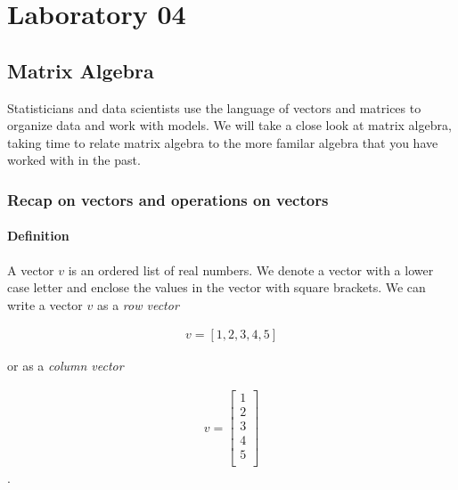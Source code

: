 
\chapter{Laboratory 04}


\hypertarget{matrix-algebra}{%
\section{Matrix Algebra}\label{matrix-algebra}}

Statisticians and data scientists use the language of vectors and
matrices to organize data and work with models. We will take a close
look at matrix algebra, taking time to relate matrix algebra to the more
familar algebra that you have worked with in the past.

    \hypertarget{recap-on-vectors-and-operations-on-vectors}{%
\subsection{Recap on vectors and operations on
vectors}\label{recap-on-vectors-and-operations-on-vectors}}

\hypertarget{definition}{%
\subsubsection{Definition}\label{definition}}

A vector \(v\) is an ordered list of real numbers. We denote a vector
with a lower case letter and enclose the values in the vector with
square brackets. We can write a vector \(v\) as a \emph{row vector}

\begin{align}
    v = [1,2,3,4,5]
\end{align}

or as a \emph{column vector}

\begin{align}
    v = \left [
        \begin{matrix}
            1 \\ 
            2 \\
            3 \\
            4 \\
            5 \\
        \end{matrix} \right ]
\end{align}.

